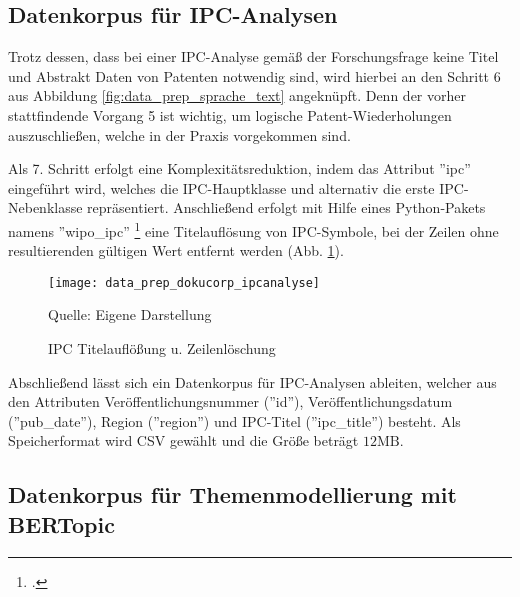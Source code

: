 \subsection{Datenkorpus für \ac{IPC}-Analysen}\label{sec:data_korp_ipc}

Trotz dessen, dass bei einer \ac{IPC}-Analyse gemäß der Forschungsfrage keine Titel und Abstrakt Daten von Patenten notwendig sind, wird hierbei an den Schritt 6 aus Abbildung \ref{fig:data_prep_sprache_text} angeknüpft. Denn der vorher stattfindende Vorgang 5 ist wichtig, um logische Patent-Wiederholungen auszuschließen, welche in der Praxis vorgekommen sind. 

Als 7. Schritt erfolgt eine Komplexitätsreduktion, indem das Attribut ''ipc'' eingeführt wird, welches die \ac{IPC}-Hauptklasse und alternativ die erste \ac{IPC}-Nebenklasse repräsentiert. Anschließend erfolgt mit Hilfe eines Python-Pakets namens ''wipo\_ipc'' \footcite{wipo_ipc} eine Titelauflösung von IPC-Symbole, bei der Zeilen ohne resultierenden gültigen Wert entfernt werden (Abb. \ref{fig:data_prep_dokucorp_ipcanalyse}). 
\begin{figure}[H]
	\caption{IPC Titelauflößung u. Zeilenlöschung}
	\texttt{[image: data\_prep\_dokucorp\_ipcanalyse]}
	\label{fig:data_prep_dokucorp_ipcanalyse}
	\vspace{0.5em}
	\raggedright
	\normalsize{Quelle: Eigene Darstellung}
	\vspace{-1.0em}
\end{figure}
Abschließend lässt sich ein Datenkorpus für \ac{IPC}-Analysen ableiten, welcher aus den Attributen Veröffentlichungsnummer (''id''), Veröffentlichungsdatum (''pub\_date''), Region (''region'') und \ac{IPC}-Titel (''ipc\_title'') besteht. Als Speicherformat wird CSV gewählt und die Größe beträgt $12\text{MB}$.

\subsection{Datenkorpus für Themenmodellierung mit BERTopic}\label{sec:datakorp_for_topicmodel}

